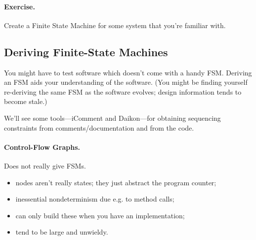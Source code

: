 \documentclass[11pt]{article}
\begin{document}
\paragraph{Exercise.}  Create a Finite State Machine for some system that
you're familiar with.

\subsection*{Deriving Finite-State Machines}
You might have to test software which doesn't come with a handy FSM.
Deriving an FSM aids your understanding of the software. (You might
be finding yourself re-deriving the same FSM as the software evolves;
design information tends to become stale.)

We'll see some tools---iComment and Daikon---for obtaining sequencing constraints from
comments/documentation and from the code.


\paragraph{Control-Flow Graphs.} Does not really give FSMs.
\begin{itemize}
\item nodes aren't really states; they just abstract the program
counter;
\item inessential nondeterminism due e.g. to method calls;
\item can only build these when you have an implementation;
\item tend to be large and unwieldy.
\end{itemize}
\end{document}
